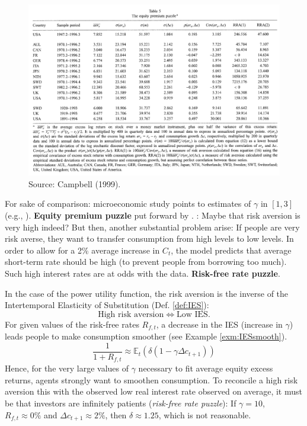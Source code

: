 \documentclass[
  12pt,
]{book}
\theoremstyle{definition}
\theoremstyle{definition}
\theoremstyle{definition}
\theoremstyle{definition}
\theoremstyle{remark}
\begin{document}
\begin{figure}

{\centering \includegraphics[width=1\linewidth]{figures/table_campbell1999_eqpuzzle} 

}

\caption{Source: Campbell (1999).}\label{fig:Campbell1}
\end{figure}

For sake of comparison: microeconomic study points to estimates of \(\gamma\) in \([1,3]\) (e.g., \citet{Hartley_Lanot_Walker_2014}).
\textbf{Equity premium puzzle} put forward by \citet{Mehra_Prescott_1985}.
\citet{Kandel_Stambaugh_1991}: Maybe that risk aversion is very high indeed?
But then, another substantial problem arise: If people are very risk averse, they want to transfer consumption from high levels to low levels.
In order to allow for a 2\% average increase in \(C_t\), the model predicts that average short-term rate should be high (to prevent people from borrowing too much). Such high interest rates are at odds with the data.
\textbf{Risk-free rate puzzle}.

In the case of the power utility function, the risk aversion is the inverse of the Intertemporal Elasticity of Substitution (Def. \ref{def:IES}):
\[
\mbox{High risk aversion} \Leftrightarrow \mbox{Low IES}.
\]
For given values of the risk-free rates \(R_{f,t}\), a decrease in the IES (increase in \(\gamma\)) leads people to make consumption smoother (see Example \ref{exm:IESsmooth}).
\[
\frac{1}{1+R_{f,t}} \approx \mathbb{E}_t(\delta (1 - \gamma \Delta c_{t+1}))
\]
Hence, for the very large values of \(\gamma\) necessary to fit average equity excess returns, agents strongly want to smoothen consumption.
To reconcile a high risk aversion this with the observed low real interest rate observed on average, it must be that investors are infinitely patients (\emph{risk-free rate puzzle}):
If \(\gamma=10\), \(R_{f,t} \approx 0\%\) and \(\Delta c_{t+1} \approx 2\%\), then \(\delta \approx 1.25\), which is not reasonable.
\end{document}
